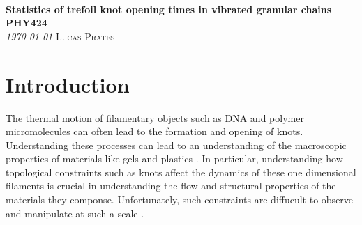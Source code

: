 \documentclass[11pt]{article}
\newcommand{\CourseDef}{PHY424} %
\newcommand{\TitleDef}{Statistics of trefoil knot opening times in vibrated granular chains} %
\newcommand{\AuthorDef}{Lucas Prates} %
\begin{document}
\thispagestyle{plain}
{\noindent\Huge\bf  \\[0.5\baselineskip] {\selectfont  \TitleDef}         }\\[2\baselineskip] %
{ {\bf {}\selectfont \CourseDef}\\ {\textit{\selectfont     \today}}}\hspace{150pt}    {\large \textsc{\AuthorDef}} %
\\[1.4\baselineskip]
\vspace{-15pt}


\begin{abstract}
    This paper details my study of the opening times of trefoil knots in vertically vibrated
    granular chains. I find strong evidence of a quadradic relationship between the trefoil's 
    mean opening time, $\tau_{\text{avg}}$, and the length of the granular chain, $N$. 
    Additionally, I find quantitative evidence that the knot's survival time distribution 
    $S(t,N)$ can be expressed as a function of a single parameter, $t/\tau_{avg}$.
\end{abstract}

\section{Introduction}
The thermal motion of filamentary objects such as DNA
and polymer micromolecules can often lead to the formation and opening of knots. 
Understanding these processes can lead to an understanding of the macroscopic properties 
of materials like gels and plastics \citep{Meluzzi2010}. In particular, understanding how 
topological constraints such as knots affect the dynamics of these one dimensional filaments 
is crucial in understanding the flow and structural properties of the materials they componse. 
Unfortunately, such constraints are diffucult to observe and manipulate at such a scale 
\citep{BenNaim2001}.\\
\end{document}
